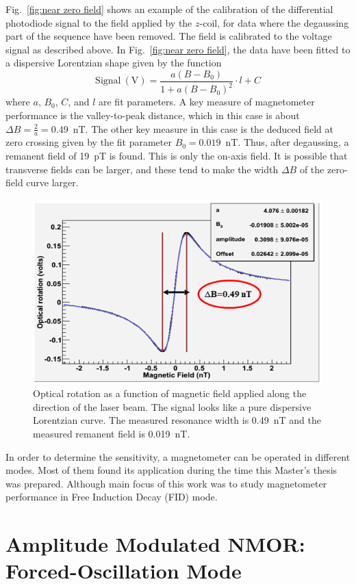 Fig.~\ref{fig:near zero field} shows an example of the calibration of
the differential photodiode signal to the field applied by the
$z$-coil, for data where the degaussing part of the sequence have been
removed.  The field is calibrated to the voltage signal as described
above.  In Fig.~\ref{fig:near zero field}, the data have been fitted
to a dispersive Lorentzian shape given by the function
\begin{equation}
\mathrm{Signal~(V)}=\frac{a(B-B_0)}{1+a(B-B_0)^2}\cdot l+C
\end{equation}
where $a$, $B_0$, $C$, and $l$ are fit parameters.  A key measure of
magnetometer performance is the valley-to-peak distance, which in this
case is about $\Delta B=\frac{2}{a}=0.49$~nT.  The other key measure
in this case is the deduced field at zero crossing given by the fit
parameter $B_0=0.019$~nT.  Thus, after degaussing, a remanent field of
19~pT is found.  This is only the on-axis field.  It is possible that
transverse fields can be larger, and these tend to make the width
$\Delta B$ of the zero-field curve larger.

\begin{figure}[h]
\centering\includegraphics[width=0.7\linewidth]{figures/near_zero_field}
\caption{Optical rotation as a function of magnetic field applied
  along the direction of the laser beam. The signal looks like a pure
  dispersive Lorentzian curve. The measured resonance width is 0.49~nT
  and the measured remanent field is 0.019~nT.\label{fig:near zero
    field}}
\end{figure}

In order to determine the sensitivity, a magnetometer can be operated
in different modes. Most of them found its application during the time
this Master's thesis was prepared. Although main focus of this work
was to study magnetometer performance in Free Induction Decay (FID)
mode.

\section{Amplitude Modulated NMOR:  Forced-Oscillation Mode\label{sec:Forced-Oscillation Mode}}

